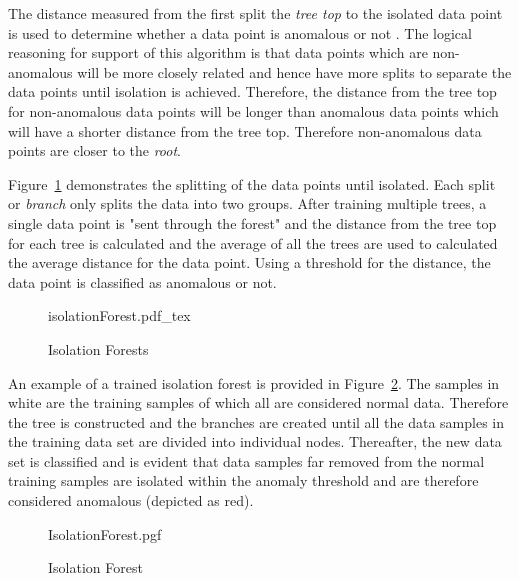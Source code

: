 The distance measured from the first split the \emph{tree top} to the isolated data point is used to determine whether a data point is anomalous or not \cite{Hariri2021}. The logical reasoning for support of this algorithm is that data points which are non-anomalous will be more closely related and hence have more splits to separate the data points until isolation is achieved. Therefore, the distance from the tree top for non-anomalous data points will be longer than anomalous data points which will have a shorter distance from the tree top. Therefore non-anomalous data points are closer to the \emph{root}. 

Figure~\ref{Figure-Isolation_Forest} demonstrates the splitting of the data points until isolated. Each split or \emph{branch} only splits the data into two groups. After training multiple trees, a single data point is "sent through the forest" and the distance from the tree top for each tree is calculated and the average of all the trees are used to calculated the average distance for the data point. Using a threshold for the distance, the data point is classified as anomalous or not.

%	
%	

\begin{figure}[!hbt]
	\centering
	\def\svgwidth{16cm}
	{isolationForest.pdf_tex}
	\caption[Isolation Forest]{Isolation Forests \cite{Chen2020}}
	\label{Figure-Isolation_Forest} 
\end{figure}

An example of a trained isolation forest is provided in Figure~\ref{fig:IsolationForest}. The samples in white are the training samples of which all are considered normal data. Therefore the tree is constructed and the branches are created until all the data samples in the training data set are divided into individual nodes. Thereafter, the new data set is classified and is evident that data samples far removed from the normal training samples are isolated within the anomaly threshold and are therefore considered anomalous (depicted as red).
\begin{figure}[!hbt]
	\centering
	{IsolationForest.pgf}
	\caption{Isolation Forest}
	\label{fig:IsolationForest}
\end{figure}

